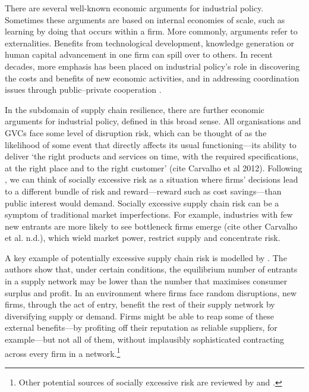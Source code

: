 \documentclass{article}
\begin{document}
There are several well-known economic arguments for industrial policy. Sometimes these arguments are based on internal economies of scale, such as learning by doing that occurs within a firm. More commonly, arguments refer to externalities. Benefits from technological development, knowledge generation or human capital advancement in one firm can spill over to others. In recent decades, more emphasis has been placed on industrial policy's role in discovering the costs and benefits of new economic activities, and in addressing coordination issues through public--private cooperation \parencite{rodrik_industrial_nodate}.

In the subdomain of supply chain resilience, there are further economic arguments for industrial policy, defined in this broad sense. All organisations and GVCs face some level of disruption risk, which can be thought of as the likelihood of some event that directly affects its usual functioning---its ability to deliver `the right products and services on time, with the required specifications, at the right place and to the right customer' (cite Carvalho et al 2012). Following \textcite{baldwin_risks_2022}, we can think of socially excessive risk as a situation where firms' decisions lead to a different bundle of risk and reward---reward such as cost savings---than public interest would demand. Socially excessive supply chain risk can be a symptom of traditional market imperfections. For example, industries with few new entrants are more likely to see bottleneck firms emerge (cite other Carvalho et al. n.d.), which wield market power, restrict supply and concentrate risk.

A key example of potentially excessive supply chain risk is modelled by \textcite{bimpikis_supply_2019}. The authors show that, under certain conditions, the equilibrium number of entrants in a supply network may be lower than the number that maximises consumer surplus and profit. In an environment where firms face random disruptions, new firms, through the act of entry, benefit the rest of their supply network by diversifying supply or demand. Firms might be able to reap some of these external benefits---by profiting off their reputation as reliable suppliers, for example---but not all of them, without implausibly sophisticated contracting across every firm in a network.\footnote{Other potential sources of socially excessive risk are reviewed by \textcite{elliott_networks_2022} and \textcite{hardwick_policy_2024}.} 
\end{document}

